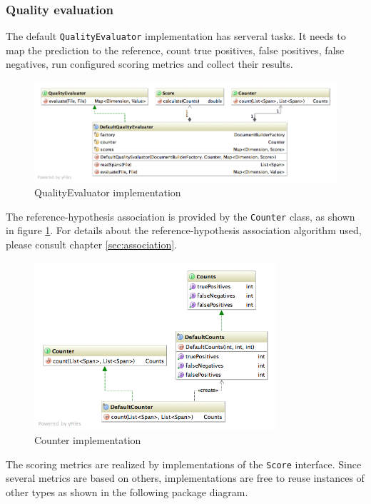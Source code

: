 \newpage
\subsubsection{Quality evaluation}
The default \texttt{QualityEvaluator} implementation has serveral tasks. It needs to map the prediction to the reference, count true positives, false positives, false negatives, run configured scoring metrics and collect their results.

\begin{figure}[H]
\centering
\includegraphics[width=\textwidth]{quality-evaluation.png}
\caption{QualityEvaluator implementation}
\end{figure}

The reference-hypothesis association is provided by the \texttt{Counter} class, as shown in figure \ref{fig:counter}. For details about the reference-hypothesis association algorithm used, please consult chapter \ref{sec:association}.

\begin{figure}[H]
\centering
\includegraphics[width=0.8\textwidth]{counter.png}
\caption{Counter implementation}
\label{fig:counter}
\end{figure}

The scoring metrics are realized by implementations of the \texttt{Score} interface. Since several metrics are based on others, implementations are free to reuse instances of other types as shown in the following package diagram.

